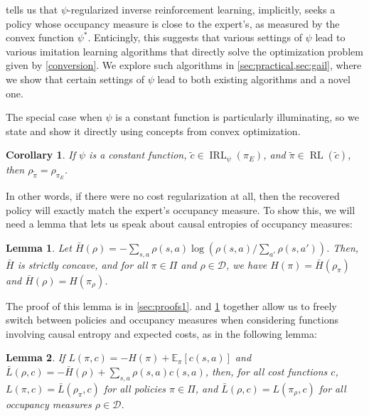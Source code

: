 \documentclass{article}
\newtheorem{lemma}{Lemma}[section]
\newtheorem{corollary}{Corollary}[proposition]
\newcommand\bbE{\ensuremath{\mathbb{E}}} %
\newcommand{\1}{\mathbb{I}} %
\DeclareMathOperator{\rl}{RL}
\DeclareMathOperator{\irl}{IRL} %
\begin{document}
 tells us that $\psi$-regularized inverse reinforcement learning, implicitly, seeks a policy whose occupancy measure is close to the expert's, as measured by the convex function $\psi^*$.
Enticingly, this suggests that various settings of $\psi$ lead to various imitation learning algorithms that directly solve the optimization problem given by \cref{conversion}.
We explore such algorithms in \cref{sec:practical,sec:gail}, where we show that certain settings of $\psi$ lead to both existing algorithms and a novel one.

The special case when $\psi$ is a constant function is particularly illuminating, so we state and show it directly using concepts from convex optimization.
\begin{corollary}
\label{exactmatching}
If $\psi$ is a constant function, $\tilde c \in \irl_\psi(\pi_E)$, and $\tilde\pi \in \rl(\tilde c)$, then $\rho_{\tilde\pi} = \rho_{\pi_E}$.
\end{corollary}
In other words, if there were no cost regularization at all, then the recovered policy will exactly match the expert's occupancy measure. To show this, we will need a lemma that lets us speak about causal entropies of occupancy measures:
\begin{lemma} \label{occmeascausalent}
Let $\bar H(\rho) = -\sum_{s,a} \rho(s,a)\log ( \rho(s,a) / \sum_{a'}\rho(s,a') )$. Then, $\bar H$ is strictly concave, and for all $\pi \in \Pi$ and $\rho \in \mathcal{D}$, we have $H(\pi) = \bar H(\rho_\pi)$ and $\bar H(\rho) = H(\pi_\rho)$.
\end{lemma}
The proof of this lemma is in \cref{sec:proofs1}.  and \cref{occmeascausalent} together allow us to freely switch between policies and occupancy measures when considering functions involving causal entropy and expected costs, as in the following lemma:
\begin{lemma}\label{exchange}
If $L(\pi,c) = -H(\pi) + \bbE_{\pi}[c(s,a)]$ and $\bar L(\rho,c) = -\bar H(\rho) + \sum_{s,a}\rho(s,a)c(s,a)$, then, for all cost functions $c$, $L(\pi,c) = \bar L(\rho_\pi, c)$ for all policies $\pi \in \Pi$, and $\bar L(\rho, c)  = L(\pi_\rho, c)$ for all occupancy measures $\rho \in \mathcal{D}$.
\end{lemma}
\end{document}

